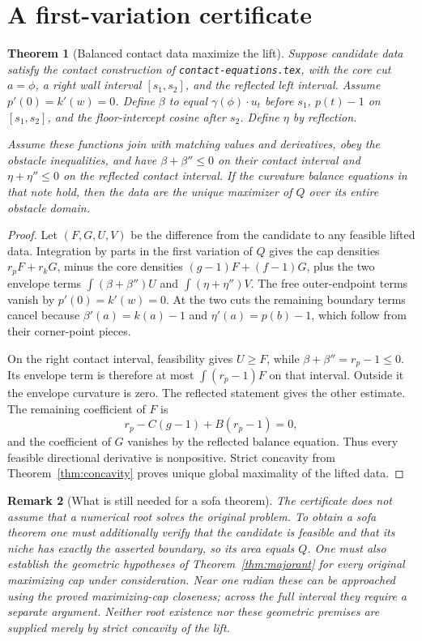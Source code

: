 \documentclass[11pt]{article}
\newtheorem{theorem}{Theorem}[section]
\newtheorem{remark}[theorem]{Remark}
\begin{document}
\section{A first-variation certificate}
\begin{theorem}[Balanced contact data maximize the lift]\label{thm:certificate}
Suppose candidate data satisfy the contact construction of \texttt{contact-equations.tex}, with the core cut $a=\phi$, a right wall interval $[s_1,s_2]$, and the reflected left interval. Assume $p'(0)=k'(w)=0$. Define $\beta$ to equal $\gamma(\phi)\cdot u_t$ before $s_1$, $p(t)-1$ on $[s_1,s_2]$, and the floor-intercept cosine after $s_2$. Define $\eta$ by reflection.

Assume these functions join with matching values and derivatives, obey the obstacle inequalities, and have $\beta+\beta''\le0$ on their contact interval and $\eta+\eta''\le0$ on the reflected contact interval. If the curvature balance equations in that note hold, then the data are the unique maximizer of $Q$ over its entire obstacle domain.
\end{theorem}
\begin{proof}
Let $(F,G,U,V)$ be the difference from the candidate to any feasible lifted data. Integration by parts in the first variation of $Q$ gives the cap densities $r_pF+r_kG$, minus the core densities $(g-1)F+(f-1)G$, plus the two envelope terms $\int(\beta+\beta'')U$ and $\int(\eta+\eta'')V$. The free outer-endpoint terms vanish by $p'(0)=k'(w)=0$. At the two cuts the remaining boundary terms cancel because $\beta'(a)=k(a)-1$ and $\eta'(a)=p(b)-1$, which follow from their corner-point pieces.

On the right contact interval, feasibility gives $U\ge F$, while $\beta+\beta''=r_p-1\le0$. Its envelope term is therefore at most $\int(r_p-1)F$ on that interval. Outside it the envelope curvature is zero. The reflected statement gives the other estimate. The remaining coefficient of $F$ is
\[
 r_p-C(g-1)+B(r_p-1)=0,
\]
and the coefficient of $G$ vanishes by the reflected balance equation. Thus every feasible directional derivative is nonpositive. Strict concavity from Theorem~\ref{thm:concavity} proves unique global maximality of the lifted data.
\end{proof}

\begin{remark}[What is still needed for a sofa theorem]
The certificate does not assume that a numerical root solves the original problem. To obtain a sofa theorem one must additionally verify that the candidate is feasible and that its niche has exactly the asserted boundary, so its area equals $Q$. One must also establish the geometric hypotheses of Theorem~\ref{thm:majorant} for every original maximizing cap under consideration. Near one radian these can be approached using the proved maximizing-cap closeness; across the full interval they require a separate argument. Neither root existence nor these geometric premises are supplied merely by strict concavity of the lift.
\end{remark}
\end{document}
